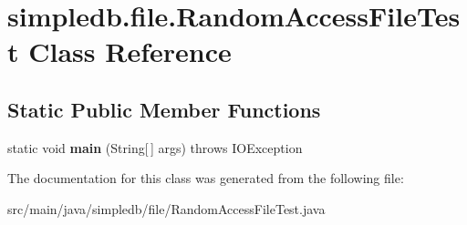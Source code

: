 \hypertarget{classsimpledb_1_1file_1_1RandomAccessFileTest}{}\section{simpledb.\+file.\+Random\+Access\+File\+Test Class Reference}
\label{classsimpledb_1_1file_1_1RandomAccessFileTest}
\subsection*{Static Public Member Functions}
\begin{DoxyCompactItemize}
\item 
\mbox{\label{classsimpledb_1_1file_1_1RandomAccessFileTest_a198b01a9b27eee8c0514d385bdf42ef1}} 
static void {\bfseries main} (String\mbox{[}$\,$\mbox{]} args)  throws I\+O\+Exception 
\end{DoxyCompactItemize}


The documentation for this class was generated from the following file\+:\begin{DoxyCompactItemize}
\item 
src/main/java/simpledb/file/Random\+Access\+File\+Test.\+java\end{DoxyCompactItemize}
